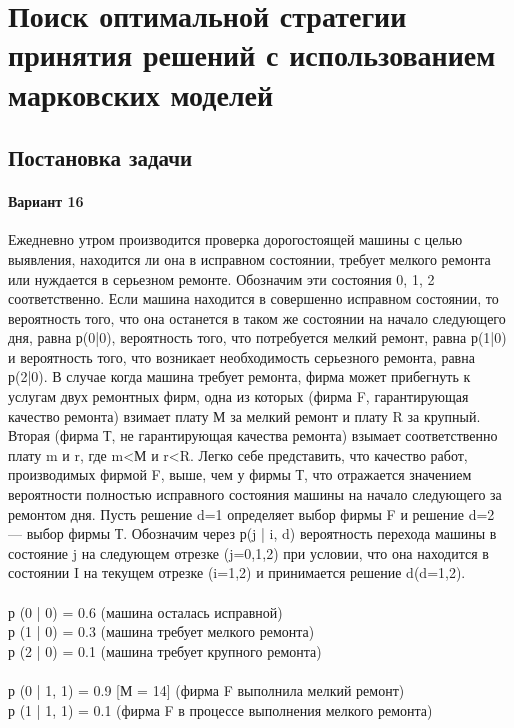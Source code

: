 \chapter{Поиск оптимальной стратегии принятия решений с использованием марковских моделей}
\section{Постановка задачи}

\subsubsection{Вариант 16}

Ежедневно утром производится проверка дорогостоящей машины с целью выявления, находится ли она в исправном состоянии, требует мелкого ремонта или нуждается в серьезном ремонте. Обозначим эти состояния 0, 1, 2 соответственно. Если машина находится в совершенно исправном состоянии, то вероятность того, что она останется в таком же состоянии на начало следующего дня, равна р(0|0), вероятность того, что потребуется мелкий ремонт, равна р(1|0) и вероятность того, что возникает необходимость серьезного ремонта, равна р(2|0). В случае когда машина требует ремонта, фирма может прибегнуть к услугам двух ремонтных фирм, одна из которых (фирма F, гарантирующая качество ремонта) взимает плату М за мелкий ремонт и плату R за крупный. Вторая (фирма Т, не гарантирующая качества ремонта) взымает соответственно плату m и r, где m<М и r<R. Легко себе представить, что качество работ, производимых фирмой F, выше, чем у фирмы Т, что отражается значением вероятности полностью исправного состояния машины на начало следующего за ремонтом дня. Пусть решение d=1 определяет выбор фирмы F и решение d=2 — выбор фирмы Т. Обозначим через р(j | i, d) вероятность перехода машины в состояние j на следующем отрезке (j=0,1,2) при условии, что она находится в состоянии I на текущем отрезке (i=1,2) и принимается решение d(d=1,2).
\\\\
р (0 | 0) = 0.6 (машина осталась исправной)\\
р (1 | 0) = 0.3 (машина требует мелкого ремонта)\\
р (2 | 0) = 0.1 (машина требует крупного ремонта)\\\\
р (0 | 1, 1) = 0.9 [М = 14] (фирма F выполнила мелкий ремонт)\\
р (1 | 1, 1) = 0.1 (фирма F в процессе выполнения мелкого ремонта)\\
